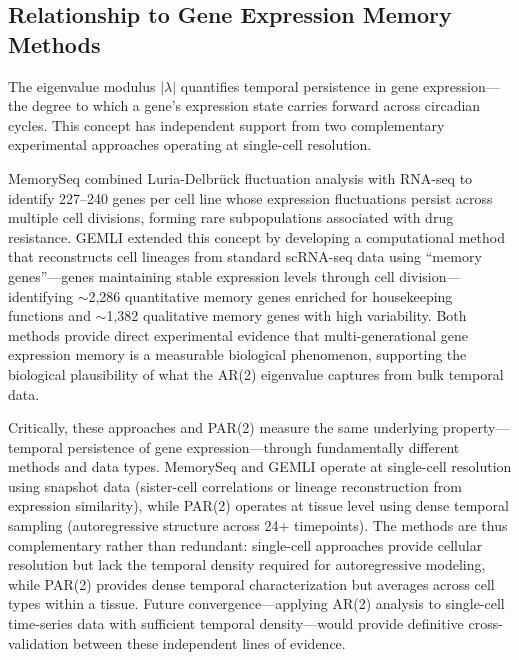 \documentclass[11pt,letterpaper]{article}
\begin{document}
\subsection{Relationship to Gene Expression Memory Methods}

The eigenvalue modulus $|\lambda|$ quantifies temporal persistence in gene expression---the degree to which a gene's expression state carries forward across circadian cycles. This concept has independent support from two complementary experimental approaches operating at single-cell resolution.

MemorySeq \citep{raj2020memoryseq} combined Luria-Delbr\"uck fluctuation analysis with RNA-seq to identify 227--240 genes per cell line whose expression fluctuations persist across multiple cell divisions, forming rare subpopulations associated with drug resistance. GEMLI \citep{eisele2024gemli} extended this concept by developing a computational method that reconstructs cell lineages from standard scRNA-seq data using ``memory genes''---genes maintaining stable expression levels through cell division---identifying $\sim$2,286 quantitative memory genes enriched for housekeeping functions and $\sim$1,382 qualitative memory genes with high variability. Both methods provide direct experimental evidence that multi-generational gene expression memory is a measurable biological phenomenon, supporting the biological plausibility of what the AR(2) eigenvalue captures from bulk temporal data.

Critically, these approaches and PAR(2) measure the same underlying property---temporal persistence of gene expression---through fundamentally different methods and data types. MemorySeq and GEMLI operate at single-cell resolution using snapshot data (sister-cell correlations or lineage reconstruction from expression similarity), while PAR(2) operates at tissue level using dense temporal sampling (autoregressive structure across 24+ timepoints). The methods are thus complementary rather than redundant: single-cell approaches provide cellular resolution but lack the temporal density required for autoregressive modeling, while PAR(2) provides dense temporal characterization but averages across cell types within a tissue. Future convergence---applying AR(2) analysis to single-cell time-series data with sufficient temporal density---would provide definitive cross-validation between these independent lines of evidence.
\end{document}
